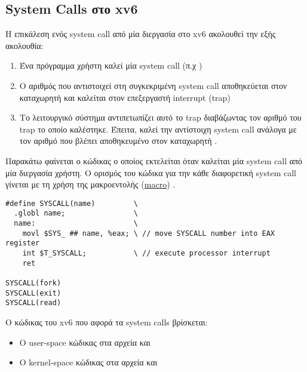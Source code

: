\documentclass[18pt]{extarticle}
\begin{document}
\subsection{System Calls στο xv6}

Η επικάλεση ενός system call από μία διεργασία στο xv6 ακολουθεί την εξής ακολουθία:

\begin{enumerate}
    \item Ένα πρόγραμμα χρήστη καλεί μία system call (π.χ )
    \item Ο αριθμός που αντιστοιχεί στη συγκεκριμένη system call αποθηκεύεται στον καταχωρητή  και καλείται στον επεξεργαστή interrupt (trap) 
    \item Το λειτουργικό σύστημα αντιπετωπίζει αυτό το trap διαβάζωντας τον αριθμό του trap το οποίο καλέστηκε. Έπειτα, καλεί την αντίστοιχη system call ανάλογα 
        με τον αριθμό που βλέπει αποθηκευμένο στον καταχωρητή .
\end{enumerate}

Παρακάτω φαίνεται ο  κώδικας ο οποίος εκτελείται όταν καλείται μία system call από μία διεργασία χρήστη.
Ο ορισμός του κώδικα για την κάθε διαφορετική system call γίνεται με τη χρήση της μακροεντολής 
(\href{https://gcc.gnu.org/onlinedocs/cpp/Macros.html}{macro}) .

\begin{file}
\begin{verbatim}
#define SYSCALL(name)         \
  .globl name;                \
  name:                       \
    movl $SYS_ ## name, %eax; \ // move SYSCALL number into EAX register
    int $T_SYSCALL;           \ // execute processor interrupt
    ret

SYSCALL(fork)
SYSCALL(exit)
SYSCALL(read)
\end{verbatim}
\end{file}


\begin{info}[Σημείωση:]
    Ο κώδικας του xv6 που αφορά τα system calls βρίσκεται:

    \begin{itemize}
        \item Ο user-space κώδικας στα αρχεία  και 
        \item Ο kernel-space κώδικας στα αρχεία  και  
    \end{itemize}
\end{info}
\end{document}
